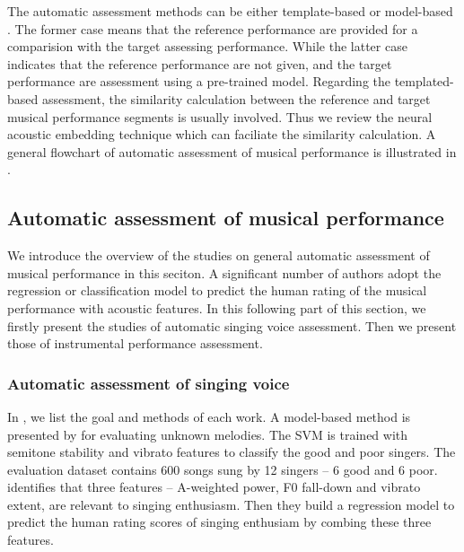 The automatic assessment methods can be either template-based  or model-based . The former case means that the reference performance are provided for a comparision with the target assessing performance. While the latter case indicates that the reference performance are not given, and the target performance are assessment using a pre-trained model. Regarding the templated-based assessment, the similarity calculation between the reference and target musical performance segments is usually involved. Thus we review the neural acoustic embedding technique which can faciliate the similarity calculation. A general flowchart of automatic assessment of musical performance is illustrated in .

\subsection{Automatic assessment of musical performance}

We introduce the overview of the studies on general automatic assessment of musical performance in this seciton. A significant number of authors adopt the regression or classification model to predict the human rating of the musical performance with acoustic features. In this following part of this section, we firstly present the studies of automatic singing voice assessment. Then we present those of instrumental performance assessment.

\subsubsection{Automatic assessment of singing voice}
In , we list the goal and methods of each work. A model-based method is presented by  for evaluating unknown melodies. The \gls{SVM} is trained with semitone stability and vibrato features to classify the good and poor singers. The evaluation dataset contains 600 songs sung by 12 singers -- 6 good and 6 poor.  identifies that three features -- A-weighted power, F0 fall-down and vibrato extent, are relevant to singing enthusiasm. Then they build a regression model to predict the human rating scores of singing enthusiam by combing these three features.

